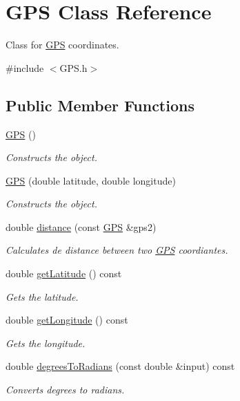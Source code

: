 \hypertarget{classGPS}{}\section{G\+PS Class Reference}
\label{classGPS}


Class for \hyperlink{classGPS}{G\+PS} coordinates.  




{\ttfamily \#include $<$G\+P\+S.\+h$>$}

\subsection*{Public Member Functions}
\begin{DoxyCompactItemize}
\item 
\hyperlink{classGPS_a0c347a188512d0d5cf7ed5c91b145fc4}{G\+PS} ()
\begin{DoxyCompactList}\small\item\em Constructs the object. \end{DoxyCompactList}\item 
\hyperlink{classGPS_aef8b0d02153efdf5dc94f3249e79c913}{G\+PS} (double latitude, double longitude)
\begin{DoxyCompactList}\small\item\em Constructs the object. \end{DoxyCompactList}\item 
double \hyperlink{classGPS_ae4ef07b40563fc8e3eff42663b23e4a6}{distance} (const \hyperlink{classGPS}{G\+PS} \&gps2)
\begin{DoxyCompactList}\small\item\em Calculates de distance between two \hyperlink{classGPS}{G\+PS} coordiantes. \end{DoxyCompactList}\item 
double \hyperlink{classGPS_a3838be0e132205e5964d62feff22a942}{get\+Latitude} () const 
\begin{DoxyCompactList}\small\item\em Gets the latitude. \end{DoxyCompactList}\item 
double \hyperlink{classGPS_a38f262c800ff15583b0f1a5e52cd8a95}{get\+Longitude} () const 
\begin{DoxyCompactList}\small\item\em Gets the longitude. \end{DoxyCompactList}\item 
double \hyperlink{classGPS_a4c0a2af15fb71993b8d801a1853d7f59}{degrees\+To\+Radians} (const double \&input) const 
\begin{DoxyCompactList}\small\item\em Converts degrees to radians. \end{DoxyCompactList}\end{DoxyCompactItemize}


